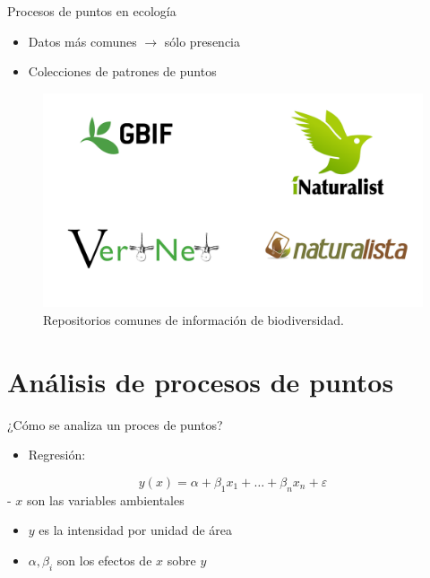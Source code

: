 \documentclass[
  11pt,
  ignorenonframetext,
]{beamer}
\providecommand{\tightlist}{%
  \setlength{\itemsep}{0pt}\setlength{\parskip}{0pt}}
\begin{document}
\begin{frame}{Procesos de puntos en ecología}
\protect\hypertarget{procesos-de-puntos-en-ecologuxeda}{}
\begin{itemize}
\item
  Datos más comunes \(\rightarrow\) sólo presencia
\item
  Colecciones de patrones de puntos
\end{itemize}

\begin{figure}
\centering
\includegraphics{Figuras/Repositorios.png}
\caption{Repositorios comunes de información de biodiversidad.}
\end{figure}
\end{frame}

\hypertarget{anuxe1lisis-de-procesos-de-puntos}{%
\section{Análisis de procesos de
puntos}\label{anuxe1lisis-de-procesos-de-puntos}}

\begin{frame}{¿Cómo se analiza un proces de puntos?}
\protect\hypertarget{cuxf3mo-se-analiza-un-proces-de-puntos}{}
\begin{itemize}
\tightlist
\item
  Regresión:
\end{itemize}

\[ y(x) = \alpha + \beta_1 x_1 + \dots + \beta_n x_n + \varepsilon\] -
\(x\) son las variables ambientales

\begin{itemize}
\item
  \(y\) es la intensidad por unidad de área
\item
  \(\alpha, \beta_i\) son los efectos de \(x\) sobre \(y\)
\end{itemize}
\end{frame}
\end{document}
